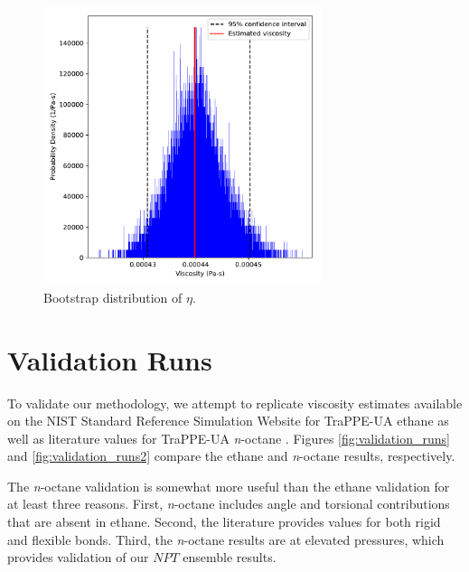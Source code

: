 \documentclass[preprint,review,11pt]{elsarticle}
\begin{document}
	\begin{figure}[htb!]
		\centering
		\includegraphics[width=3.2in]{GK_bootstraps_MCMC_rho0.pdf}
		\caption{Bootstrap distribution of $\eta$.}
		\label{fig:bootstraps}
	\end{figure} 

%	
	

    \clearpage
	\newpage

	\section{Validation Runs} \label{Validation Runs}
	
	To validate our methodology, we attempt to replicate viscosity estimates available on the NIST Standard Reference Simulation Website \cite{NIST_SRSW} for TraPPE-UA ethane as well as literature values for TraPPE-UA \textit{n}-octane \cite{Kioupis2000,Nieto2006}. Figures \ref{fig:validation_runs} and \ref{fig:validation_runs2} compare the ethane and \textit{n}-octane results, respectively.
	
	The \textit{n}-octane validation is somewhat more useful than the ethane validation for at least three reasons. First, \textit{n}-octane includes angle and torsional contributions that are absent in ethane. Second, the literature provides values for both rigid and flexible bonds. Third, the \textit{n}-octane results are at elevated pressures, which provides validation of our $NPT$ ensemble results. 
	
\end{document}
